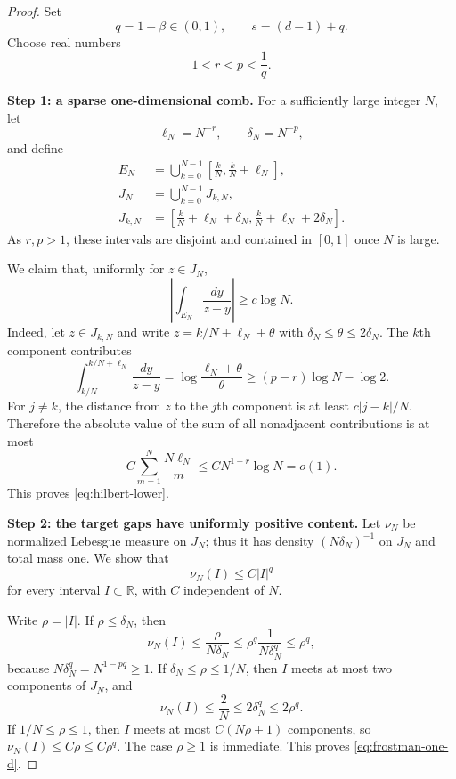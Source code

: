 \documentclass[11pt]{article}
\newcommand{\R}{\mathbb R}
\newcommand{\1}{\mathbf 1}
\begin{document}
\begin{proof}
Set
\[
 q=1-\beta\in(0,1),\qquad s=(d-1)+q.
\]
Choose real numbers
\begin{equation}\label{eq:parameters}
 1<r<p<\frac1q.
\end{equation}

\medskip
\noindent\textbf{Step 1: a sparse one-dimensional comb.}
For a sufficiently large integer $N$, let
\[
 \ell_N=N^{-r},\qquad \delta_N=N^{-p},
\]
and define
\begin{align*}
 E_N&=\bigcup_{k=0}^{N-1}
       \left[\frac{k}{N},\frac{k}{N}+\ell_N\right],\\
 J_N&=\bigcup_{k=0}^{N-1}J_{k,N},\\
 J_{k,N}&=\left[\frac{k}{N}+\ell_N+\delta_N,
                   \frac{k}{N}+\ell_N+2\delta_N\right].
\end{align*}
As $r,p>1$, these intervals are disjoint and contained in $[0,1]$ once
$N$ is large.

We claim that, uniformly for $z\in J_N$,
\begin{equation}\label{eq:hilbert-lower}
 \left\lvert\int_{E_N}\frac{dy}{z-y}\right\rvert
 \geq c\log N.
\end{equation}
Indeed, let $z\in J_{k,N}$ and write
$z=k/N+\ell_N+\theta$ with
$\delta_N\leq\theta\leq2\delta_N$.  The $k$th component contributes
\[
 \int_{k/N}^{k/N+\ell_N}\frac{dy}{z-y}
 =\log\frac{\ell_N+\theta}{\theta}
 \geq (p-r)\log N-\log2.
\]
For $j\neq k$, the distance from $z$ to the $j$th component is at least
$c\lvert j-k\rvert/N$.  Therefore the absolute value of the sum of all
nonadjacent contributions is at most
\[
 C\sum_{m=1}^{N}\frac{N\ell_N}{m}
 \leq C N^{1-r}\log N=o(1).
\]
This proves \eqref{eq:hilbert-lower}.

\medskip
\noindent\textbf{Step 2: the target gaps have uniformly positive content.}
Let $\nu_N$ be normalized Lebesgue measure on $J_N$; thus it has density
$(N\delta_N)^{-1}$ on $J_N$ and total mass one.  We show that
\begin{equation}\label{eq:frostman-one-d}
 \nu_N(I)\leq C\lvert I\rvert^q
\end{equation}
for every interval $I\subset\R$, with $C$ independent of $N$.

Write $\rho=\lvert I\rvert$.  If $\rho\leq\delta_N$, then
\[
 \nu_N(I)\leq\frac{\rho}{N\delta_N}
 \leq \rho^q\frac{1}{N\delta_N^q}
 \leq\rho^q,
\]
because $N\delta_N^q=N^{1-pq}\geq1$.  If
$\delta_N\leq\rho\leq1/N$, then $I$ meets at most two components of $J_N$,
and
\[
 \nu_N(I)\leq\frac2N\leq2\delta_N^q\leq2\rho^q.
\]
If $1/N\leq\rho\leq1$, then $I$ meets at most $C(N\rho+1)$ components, so
$\nu_N(I)\leq C\rho\leq C\rho^q$.  The case $\rho\geq1$ is immediate.
This proves \eqref{eq:frostman-one-d}.


\end{proof}
\end{document}
